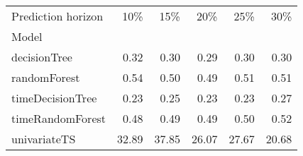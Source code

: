 \begin{tabular}{lrrrrr}
\toprule
Prediction horizon & 10\% & 15\% & 20\% & 25\% & 30\% \\
Model &  &  &  &  &  \\
\midrule
decisionTree & 0.32 & 0.30 & 0.29 & 0.30 & 0.30 \\
randomForest & 0.54 & 0.50 & 0.49 & 0.51 & 0.51 \\
timeDecisionTree & 0.23 & 0.25 & 0.23 & 0.23 & 0.27 \\
timeRandomForest & 0.48 & 0.49 & 0.49 & 0.50 & 0.52 \\
univariateTS & 32.89 & 37.85 & 26.07 & 27.67 & 20.68 \\
\bottomrule
\end{tabular}
